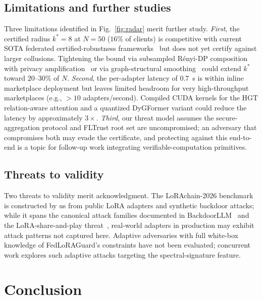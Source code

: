 \documentclass[12pt,a4paper]{article}
\theoremstyle{definition}
\theoremstyle{remark}
\newcommand{\modelname}{FedLoRAGuard}
\newcommand{\benchname}{LoRAchain-2026}
\begin{document}
\subsection{Limitations and further studies}
\label{subsec:limitations}

Three limitations identified in Fig.~\ref{fig:radar} merit further study. \emph{First}, the certified radius $k^* = 8$ at $N = 50$ ($16\%$ of clients) is competitive with current SOTA federated certified-robustness frameworks~\cite{xie2021crfl,cao2022flcert} but does not yet certify against larger collusions. Tightening the bound via subsampled R\'enyi-DP composition with privacy amplification~\cite{mironov2017renyi} or via graph-structural smoothing~\cite{scholten2022randomized} could extend $k^*$ toward $20$--$30\%$ of $N$. \emph{Second}, the per-adapter latency of $0.7$~s is within inline marketplace deployment but leaves limited headroom for very high-throughput marketplaces (e.g., $> 10$ adapters/second). Compiled CUDA kernels for the HGT relation-aware attention and a quantized DyGFormer variant could reduce the latency by approximately $3 \times$. \emph{Third}, our threat model assumes the secure-aggregation protocol and FLTrust root set are uncompromised; an adversary that compromises both may evade the certificate, and protecting against this end-to-end is a topic for follow-up work integrating verifiable-computation primitives.

\subsection{Threats to validity}

Two threats to validity merit acknowledgment. The \benchname{} benchmark is constructed by us from public LoRA adapters and synthetic backdoor attacks; while it spans the canonical attack families documented in BackdoorLLM~\cite{li2025backdoorllm} and the LoRA-share-and-play threat~\cite{liu2024loraattack}, real-world adapters in production may exhibit attack patterns not captured here. Adaptive adversaries with full white-box knowledge of \modelname{}'s constraints have not been evaluated; concurrent work explores such adaptive attacks targeting the spectral-signature feature.


\section{Conclusion}
\label{sec:conclusion}
\end{document}
